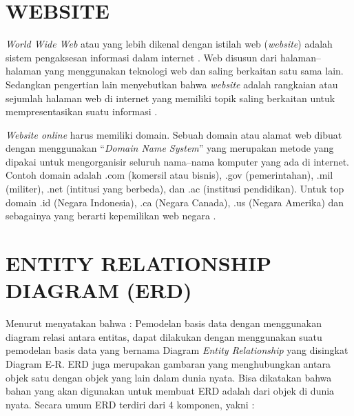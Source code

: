 \section{\uppercase{Website}}
\textit{World Wide Web} atau yang lebih dikenal dengan istilah web (\textit{website}) adalah sistem pengaksesan informasi dalam internet \citep{abdul2014pengenalan}. Web disusun dari halaman–halaman yang menggunakan teknologi web dan saling berkaitan satu sama lain. Sedangkan pengertian lain menyebutkan bahwa \textit{website} adalah rangkaian atau sejumlah halaman web di internet yang memiliki topik saling berkaitan untuk mempresentasikan suatu informasi \citep{ginanjar2014rahasia}.

\par \textit{Website online} harus memiliki domain. Sebuah domain atau alamat web dibuat dengan menggunakan “\textit{Domain Name System}” yang merupakan metode yang dipakai untuk mengorganisir seluruh nama–nama komputer yang ada di internet. Contoh domain adalah .com (komersil atau bisnis), .gov (pemerintahan), .mil (militer), .net (intitusi yang berbeda), dan .ac (institusi pendidikan). Untuk top domain .id (Negara Indonesia), .ca (Negara Canada), .us (Negara Amerika) dan sebagainya yang berarti kepemilikan web negara \citep{dhika2015perancangan}.

\section{\uppercase{Entity Relationship Diagram (ERD)}}
Menurut \citep{priyadi2014} menyatakan bahwa : Pemodelan basis data dengan menggunakan diagram relasi antara entitas, dapat dilakukan dengan menggunakan suatu pemodelan basis data yang bernama Diagram \textit{Entity Relationship} yang disingkat Diagram E-R. ERD juga merupakan gambaran yang menghubungkan antara objek satu dengan objek yang lain dalam dunia nyata. Bisa dikatakan bahwa bahan yang akan digunakan untuk membuat ERD adalah dari objek di dunia nyata. Secara umum ERD terdiri dari 4 komponen, yakni :


